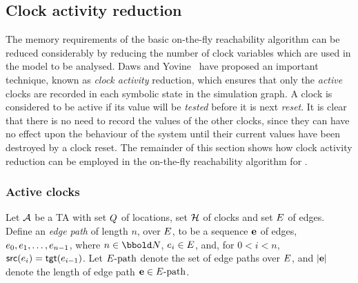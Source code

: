 \subsection{Clock activity reduction}\label{ss:sgact}
The memory requirements of the basic on-the-fly reachability algorithm
can be reduced considerably by reducing the number of clock variables
which are used in the model to be analysed.  Daws and
Yovine~\cite{dy:96} have proposed an important technique, known as
\emph{clock activity} reduction, which ensures that only the \emph{active}
clocks are recorded in each symbolic state in the simulation graph. A
clock is considered to be active if its value will be \emph{tested}
before it is next \emph{reset}. It is clear that there is no need to
record the values of the other clocks, since they can have no effect
upon the behaviour of the system until their current values have been
destroyed by a clock reset. The remainder of this section shows how 
clock activity reduction can be employed in the on-the-fly reachability
algorithm for \bcandle.

\subsubsection{Active clocks} 
Let $\AA$ be a TA with set $Q$ of locations, set $\clocks$ of
clocks and set $E$ of edges.  Define an \emph{edge path} of
length $n$, over $E$, to be a sequence ${\bf e}$ of edges,
$e_0,e_1,\ldots,e_{n-1}$, where $n \in \nat$,
$e_i \in E$, and, for $0 < i < n$, $\mathop{\sf src}(e_{i}) 
= \mathop{\sf tgt}(e_{i-1})$.  Let
$\text{$E$-path}$ denote the set of edge paths over $E$, and
${\left|{\bf e}\right|}$ denote the length of edge path ${\bf e} \in \text{$E$-path}$.

